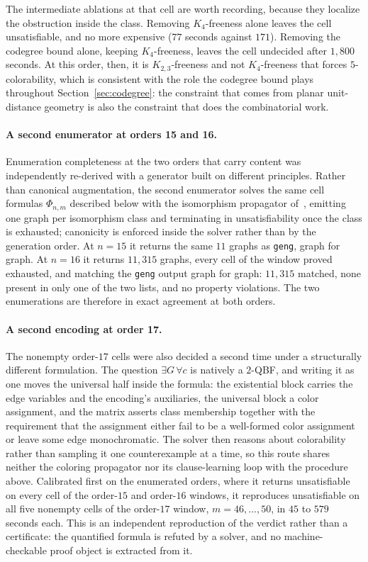 \documentclass[11pt]{article}
\theoremstyle{definition}
\begin{document}
The intermediate ablations at that cell are worth recording, because they
localize the obstruction inside the class. Removing $K_4$-freeness alone leaves
the cell unsatisfiable, and no more expensive ($77$ seconds against $171$).
Removing the codegree bound alone, keeping $K_4$-freeness, leaves the cell
undecided after $1{,}800$ seconds. At this order, then, it is $K_{2,3}$-freeness
and not $K_4$-freeness that forces $5$-colorability, which is consistent with the
role the codegree bound plays throughout Section~\ref{sec:codegree}: the
constraint that comes from planar unit-distance geometry is also the constraint
that does the combinatorial work.

\paragraph{A second enumerator at orders 15 and 16.} Enumeration completeness at
the two orders that carry content was independently re-derived with a generator
built on different principles. Rather than canonical augmentation, the second
enumerator solves the same cell formulas $\Phi_{n,m}$ described below with the
isomorphism propagator of~\cite{KirchwegerSzeider2021}, emitting one graph per
isomorphism class and terminating in unsatisfiability once the class is
exhausted; canonicity is enforced inside the solver rather than by the generation
order. At $n = 15$ it returns the same $11$ graphs as \texttt{geng}, graph for
graph. At $n = 16$ it returns $11{,}315$ graphs, every cell of the window proved
exhausted, and matching the \texttt{geng} output graph for graph: $11{,}315$
matched, none present in only one of the two lists, and no property violations.
The two enumerations are therefore in exact agreement at both orders.

\paragraph{A second encoding at order 17.} The nonempty order-$17$ cells were
also decided a second time under a structurally different formulation. The
question $\exists G\, \forall c$ is natively a $2$-QBF, and writing it as one
moves the universal half inside the formula: the existential block carries the
edge variables and the encoding's auxiliaries, the universal block a color
assignment, and the matrix asserts class membership together with the
requirement that the assignment either fail to be a well-formed color assignment
or leave some edge monochromatic. The solver then reasons about colorability
rather than sampling it one counterexample at a time, so this route shares
neither the coloring propagator nor its clause-learning loop with the procedure
above. Calibrated first on the enumerated orders, where it returns unsatisfiable
on every cell of the order-$15$ and order-$16$ windows, it reproduces
unsatisfiable on all five nonempty cells of the order-$17$ window,
$m = 46, \dots, 50$, in $45$ to $579$ seconds each. This is an independent
reproduction of the verdict rather than a certificate: the quantified formula is
refuted by a solver, and no machine-checkable proof object is extracted from it.
\end{document}
